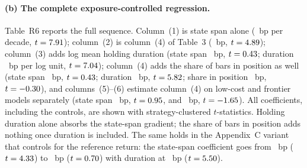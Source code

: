 \documentclass[11pt,a4paper]{article}
\begin{document}
\paragraph{(b) The complete exposure-controlled regression.} Table~R6 reports the full sequence. Column~(1) is state span alone (\RevRegTauOnlyTau~bp per decade, $t=7.91$); column~(2) is column~(4) of Table~3 (\RevRegBaseTau~bp, $t=4.89$); column~(3) adds log mean holding duration (state span \RevRegDurOnlyTau~bp, $t=0.43$; duration \RevRegDurOnlyDur~bp per log unit, $t=7.04$); column~(4) adds the share of bars in position as well (state span \RevRegExpoTau~bp, $t=0.43$; duration \RevRegExpoDur~bp, $t=5.82$; share in position \RevRegExpoPos~bp, $t=-0.30$), and columns~(5)--(6) estimate column~(4) on low-cost and frontier models separately (state span \RevRegExpoLowTau~bp, $t=0.95$, and \RevRegExpoFrontTau~bp, $t=-1.65$). All coefficients, including the controls, are shown with strategy-clustered $t$-statistics. Holding duration alone absorbs the state-span gradient; the share of bars in position adds nothing once duration is included. The same holds in the Appendix~C variant that controls for the reference return: the state-span coefficient goes from \RevRegWithRBaseTau~bp ($t=4.33$) to \RevRegWithRExpoTau~bp ($t=0.70$) with duration at \RevRegWithRExpoDur~bp ($t=5.50$).

\begin{table}[h]\centering\small
\caption*{\textbf{Table R6.} Complete exposure-controlled regression. Dependent variable $|IS|$ in bp, winsorised 1/99 within instrument; $\log_{10}\tau$ centred, $\sigma$ standardised within instrument; building-block fixed effects are signal, sizing, filter and direction effects and one indicator per risk block; strategy-clustered $t$-statistics in parentheses. Columns (5) and (6) estimate column (4) on the low-cost and frontier models.}
\resizebox{\textwidth}{!}{}
\end{table}
\end{document}
